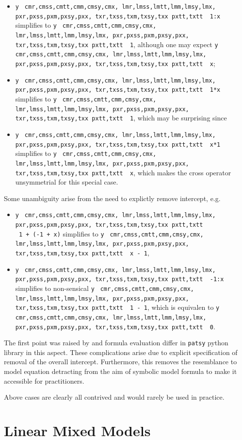\documentclass[runningheads]{llncs}
\makeatletter
\providecommand{\tightlist}{%
  \setlength{\itemsep}{0pt}\setlength{\parskip}{0pt}}
\newcommand\midtilde@raisedtilde[1][.5]{\raisebox{#1ex}{\texttildelow}}
\def\midtilde@normaltilde{\texttildelow}
\newcommand\midtilde%
{%
  \expandafter\in@\expandafter{\f@family}%
    {cmr,cmss,cmtt,cmm,cmsy,cmx,%
    lmr,lmss,lmtt,lmm,lmsy,lmx,%
    pxr,pxss,pxm,pxsy,pxx,%
    txr,txss,txm,txsy,txx}%
  \ifin@%
    \midtilde@raisedtilde%
  \else%
    \expandafter\in@\expandafter{\f@family}%
    {pxtt,txtt}%
    \ifin@%
      \midtilde@raisedtilde[.35]%
    \else%
      \midtilde@normaltilde%
    \fi%
  \fi%
}
\makeatother
\begin{document}
\begin{itemize}
\tightlist
\item
  \texttt{y} \texttt{\midtilde\ }\texttt{1:x} simplifies to \texttt{y} \texttt{\midtilde\ }\texttt{1}, although one may expect \texttt{y} \texttt{\midtilde\ }\texttt{x};
\item
  \texttt{y} \texttt{\midtilde\ }\texttt{1*x} simplifies to \texttt{y} \texttt{\midtilde\ }\texttt{1}, which may be surprising since
\item
  \texttt{y} \texttt{\midtilde\ }\texttt{x*1} simplifies to \texttt{y} \texttt{\midtilde\ }\texttt{x}, which makes the cross operator unsymmetrial for this special case.
\end{itemize}

Some unambiguity arise from the need to explictly remove intercept, e.g.

\begin{itemize}
\tightlist
\item
  \texttt{y} \texttt{\midtilde\ }\texttt{1\ +\ (-1\ +\ x)} simplifies to \texttt{y} \texttt{\midtilde\ }\texttt{x\ -\ 1},
\item
  \texttt{y} \texttt{\midtilde\ }\texttt{-1:x} simplifies to non-sensical \texttt{y} \texttt{\midtilde\ }\texttt{1\ -\ 1}, which is equivalen to \texttt{y} \texttt{\midtilde\ }\texttt{0}.
\end{itemize}

The first point was raised by \textcite{patsy} and formula evaluation differ in \texttt{patsy} python library in this aspect. These complications arise due to explicit specification of removal of the overall intercept. Furthermore, this removes the resemblance to model equation detracting from the aim of symbolic model formula to make it accessible for practitioners.

Above cases are clearly all contrived and would rarely be used in practice.

\hypertarget{lmm}{%
\section{Linear Mixed Models}\label{lmm}}
\end{document}

